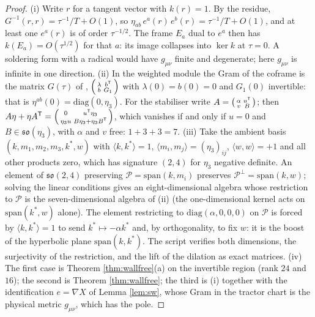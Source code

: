\documentclass[11pt]{article}
\theoremstyle{definition}
\newcommand{\ip}[2]{\langle #1, #2\rangle}
\begin{document}
\begin{proof}
(i) Write $r$ for a tangent vector with $k(r) = 1$. By the residue, $G^{-1}(r, r) = \tau^{-1}/T + O(1)$, so $\eta_{ab}\,e^a(r)\,e^b(r) = \tau^{-1}/T + O(1)$, and at least one $e^a(r)$ is of order $\tau^{-1/2}$. The frame $E_a$ dual to $e^a$ then has $k(E_a) = O(\tau^{1/2})$ for that $a$: its image collapses into $\ker k$ at $\tau = 0$. A soldering form with a radical would have $g_{\mu\nu}$ finite and degenerate; here $g_{\mu\nu}$ is infinite in one direction. (ii) In the weighted module the Gram of the coframe is the matrix $G(\tau)$ of \cite[proof of Thm.~6.2]{ButlerT4}, $\begin{psmallmatrix}\lambda & b^{\mathsf T}\\ b & G_1\end{psmallmatrix}$ with $\lambda(0) = b(0) = 0$ and $G_1(0)$ invertible: that is $\eta^{ab}(0) = \mathrm{diag}(0, \eta_3)$. For the stabiliser write $A = \begin{psmallmatrix}\alpha & u^{\mathsf T}\\ v & B\end{psmallmatrix}$; then $A\eta + \eta A^{\mathsf T} = \begin{psmallmatrix} 0 & u^{\mathsf T}\eta_3\\ \eta_3 u & B\eta_3 + \eta_3 B^{\mathsf T}\end{psmallmatrix}$, which vanishes if and only if $u = 0$ and $B \in \mathfrak{so}(\eta_3)$, with $\alpha$ and $v$ free: $1 + 3 + 3 = 7$. (iii) Take the ambient basis $(k, m_1, m_2, m_3, k^*, w)$ with $\ip{k}{k^*} = 1$, $\ip{m_i}{m_j} = (\eta_3)_{ij}$, $\ip{w}{w} = +1$ and all other products zero, which has signature $(2,4)$ for $\eta_3$ negative definite. An element of $\mathfrak{so}(2,4)$ preserving $\mathcal{P} = \mathrm{span}(k, m_i)$ preserves $\mathcal{P}^\perp = \mathrm{span}(k, w)$; solving the linear conditions gives an eight-dimensional algebra whose restriction to $\mathcal{P}$ is the seven-dimensional algebra of (ii) (the one-dimensional kernel acts on $\mathrm{span}(k^*, w)$ alone). The element restricting to $\mathrm{diag}(\alpha, 0, 0, 0)$ on $\mathcal{P}$ is forced by $\ip{k}{k^*} = 1$ to send $k^* \mapsto -\alpha k^*$ and, by orthogonality, to fix $w$: it is the boost of the hyperbolic plane $\mathrm{span}(k, k^*)$. The script verifies both dimensions, the surjectivity of the restriction, and the lift of the dilation as exact matrices. (iv) The first case is Theorem \ref{thm:wallfree}(a) on the invertible region (rank $24$ and $16$); the second is Theorem \ref{thm:wallfree}; the third is (i) together with the identification $e = \nabla X$ of Lemma \ref{lem:sw}, whose Gram in the tractor chart is the physical metric $g_{\mu\nu}$, which has the pole.
\end{proof}
\end{document}
